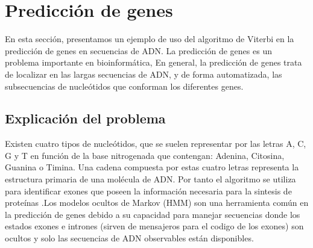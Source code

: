 \documentclass[11pt,openany]{book}
\begin{document}
\section{Predicción de genes}

En esta sección, presentamos un ejemplo de uso del algoritmo de Viterbi en la predicción de genes en secuencias de ADN. La predicción de genes es un problema importante en bioinformática,
En general, la predicción de genes trata de localizar en las largas secuencias de ADN, y de forma automatizada, las subsecuencias de nucleótidos que conforman los diferentes genes.
\subsection*{Explicación del problema}
Existen cuatro tipos de nucleótidos, que se suelen representar por las letras A, C, G y T en función de la base nitrogenada
que contengan: Adenina, Citosina, Guanina o Timina. Una cadena compuesta por estas cuatro letras representa la estructura primaria de una molécula de ADN.
Por tanto el algoritmo se utiliza para identificar exones que poseen la información necesaria para la sintesis 
de proteínas .Los modelos ocultos de Markov (HMM) son una herramienta común en la predicción de genes debido a su capacidad para manejar secuencias donde los estados exones e intrones (sirven de mensajeros para el codigo de los exones) 
son ocultos y solo las secuencias de ADN observables están disponibles. 
\end{document}
